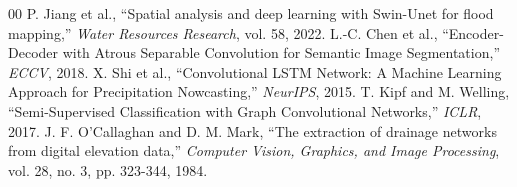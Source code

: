 \documentclass[conference]{IEEEtran}
\begin{document}
\begin{thebibliography}{00}
 P. Jiang et al., ``Spatial analysis and deep learning with Swin-Unet for flood mapping,'' \textit{Water Resources Research}, vol. 58, 2022.
 L.-C. Chen et al., ``Encoder-Decoder with Atrous Separable Convolution for Semantic Image Segmentation,'' \textit{ECCV}, 2018.
 X. Shi et al., ``Convolutional LSTM Network: A Machine Learning Approach for Precipitation Nowcasting,'' \textit{NeurIPS}, 2015.
 T. Kipf and M. Welling, ``Semi-Supervised Classification with Graph Convolutional Networks,'' \textit{ICLR}, 2017.
 J. F. O'Callaghan and D. M. Mark, ``The extraction of drainage networks from digital elevation data,'' \textit{Computer Vision, Graphics, and Image Processing}, vol. 28, no. 3, pp. 323-344, 1984.
\end{thebibliography}
\end{document}
